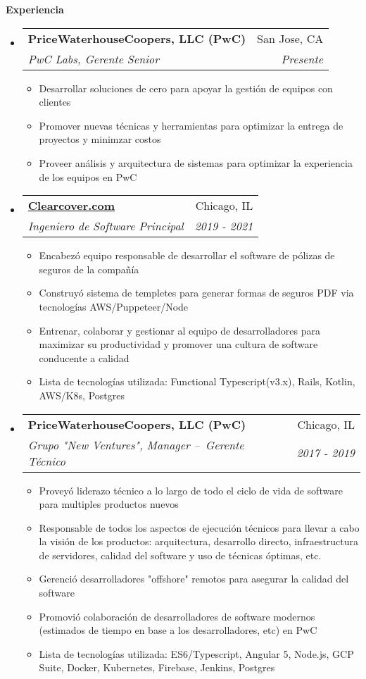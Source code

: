 \documentclass[letterpaper,11pt]{article}
\makeatletter
\newcommand{\resitem}[1]{\item #1 \vspace{-3pt}}
\newcommand{\resheading}[1]{{\large {\textbf{#1 \vphantom{p\^{E}}}}}}
\newcommand{\ressubheading}[4]{
	\begin{tabular*}{6.5in}{l@{\extracolsep{\fill}}r}
			\textbf{#1} & #2 \\
			\textit{#3} & \textit{#4} \\
	\end{tabular*}\vspace{-6pt}}
\makeatother
\begin{document}
\resheading{Experiencia}
\begin{itemize}

\item
  \ressubheading{PriceWaterhouseCoopers, LLC (PwC)}{San Jose, CA}{PwC Labs, Gerente Senior}{Presente}
	\begin{itemize}
    	\resitem{Desarrollar soluciones de cero para apoyar la gestión de equipos con clientes}
		\resitem{Promover nuevas técnicas y herramientas para optimizar la entrega de proyectos y minimzar costos}
		\resitem{Proveer análisis y arquitectura de sistemas para optimizar la experiencia de los equipos en PwC}
	\end{itemize}

\item
  \ressubheading{\href{https://clearcover.com}{Clearcover.com}}{Chicago, IL}{Ingeniero de Software Principal}{2019 - 2021}
	\begin{itemize}
    	\resitem{Encabezó equipo responsable de desarrollar el software de pólizas de seguros de la compañía}
    	\resitem{Construyó sistema de templetes para generar formas de seguros PDF via tecnologías AWS/Puppeteer/Node }
		\resitem{Entrenar, colaborar y gestionar al equipo de desarrolladores para maximizar su productividad y promover una cultura de software conducente a calidad}
		\resitem{Lista de tecnologías utilizada: Functional Typescript(v3.x), Rails, Kotlin, AWS/K8s, Postgres}
	\end{itemize}

\item
  \ressubheading{PriceWaterhouseCoopers, LLC (PwC)}{Chicago, IL}{Grupo "New Ventures", Manager – Gerente Técnico}{2017 - 2019}
	\begin{itemize}
    \resitem{Proveyó liderazo técnico a lo largo de todo el ciclo de vida de software para multiples productos nuevos}
		\resitem{Responsable de todos los aspectos de ejecución técnicos para llevar a cabo la visión de los productos: arquitectura, desarrollo directo, infraestructura de servidores, calidad del software y uso de técnicas óptimas, etc.}
		\resitem{Gerenció desarrolladores "offshore" remotos para asegurar la calidad del software}
		\resitem{Promovió colaboración de desarrolladores de software modernos (estimados de tiempo en base a los desarrolladores, etc) en PwC}
		\resitem{Lista de tecnologías utilizada: ES6/Typescript, Angular 5, Node.js, GCP Suite, Docker, Kubernetes, Firebase, Jenkins, Postgres}
	\end{itemize}


\end{itemize}
\end{document}
